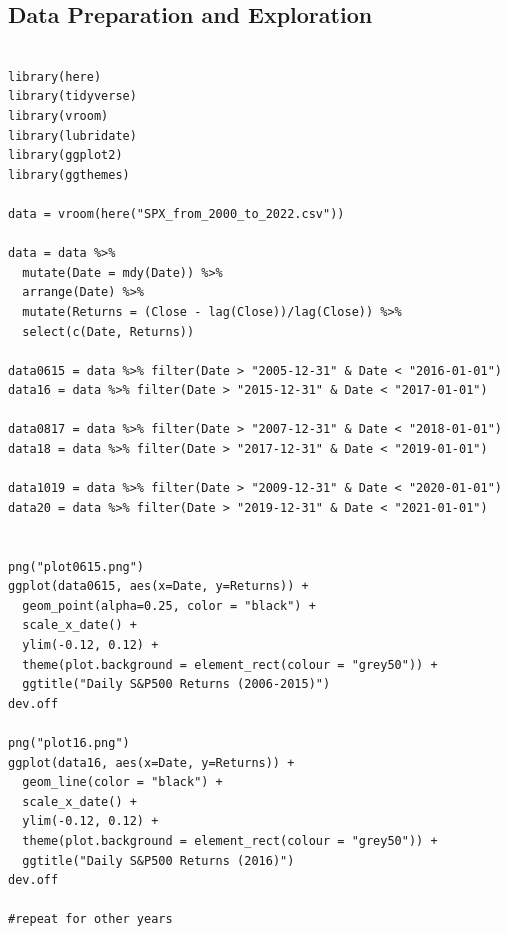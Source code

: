 \documentclass[12pt,letterpaper,reqno,fleqn]{article}
\begin{document}
\subsection{Data Preparation and Exploration}
\begin{verbatim}

library(here)
library(tidyverse)
library(vroom) 
library(lubridate)
library(ggplot2)
library(ggthemes)

data = vroom(here("SPX_from_2000_to_2022.csv"))

data = data %>%
  mutate(Date = mdy(Date)) %>%
  arrange(Date) %>%
  mutate(Returns = (Close - lag(Close))/lag(Close)) %>%
  select(c(Date, Returns)) 

data0615 = data %>% filter(Date > "2005-12-31" & Date < "2016-01-01")
data16 = data %>% filter(Date > "2015-12-31" & Date < "2017-01-01")

data0817 = data %>% filter(Date > "2007-12-31" & Date < "2018-01-01")
data18 = data %>% filter(Date > "2017-12-31" & Date < "2019-01-01")

data1019 = data %>% filter(Date > "2009-12-31" & Date < "2020-01-01")
data20 = data %>% filter(Date > "2019-12-31" & Date < "2021-01-01")


png("plot0615.png")
ggplot(data0615, aes(x=Date, y=Returns)) +
  geom_point(alpha=0.25, color = "black") +
  scale_x_date() +
  ylim(-0.12, 0.12) +
  theme(plot.background = element_rect(colour = "grey50")) +
  ggtitle("Daily S&P500 Returns (2006-2015)")
dev.off

png("plot16.png")
ggplot(data16, aes(x=Date, y=Returns)) +
  geom_line(color = "black") +
  scale_x_date() +
  ylim(-0.12, 0.12) +
  theme(plot.background = element_rect(colour = "grey50")) +
  ggtitle("Daily S&P500 Returns (2016)")
dev.off

#repeat for other years

\end{verbatim}
\end{document}
